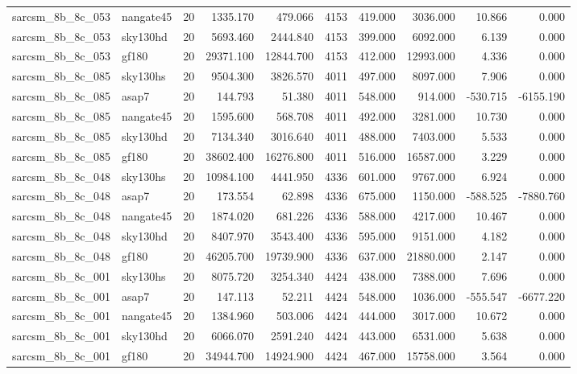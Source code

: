 \begin{tabular}{llrrrrrrrr}
sarcsm\_8b\_8c\_053 & nangate45 & 20 & 1335.170 & 479.066 & 4153 & 419.000 & 3036.000 & 10.866 & 0.000 \\
sarcsm\_8b\_8c\_053 & sky130hd & 20 & 5693.460 & 2444.840 & 4153 & 399.000 & 6092.000 & 6.139 & 0.000 \\
sarcsm\_8b\_8c\_053 & gf180 & 20 & 29371.100 & 12844.700 & 4153 & 412.000 & 12993.000 & 4.336 & 0.000 \\
sarcsm\_8b\_8c\_085 & sky130hs & 20 & 9504.300 & 3826.570 & 4011 & 497.000 & 8097.000 & 7.906 & 0.000 \\
sarcsm\_8b\_8c\_085 & asap7 & 20 & 144.793 & 51.380 & 4011 & 548.000 & 914.000 & -530.715 & -6155.190 \\
sarcsm\_8b\_8c\_085 & nangate45 & 20 & 1595.600 & 568.708 & 4011 & 492.000 & 3281.000 & 10.730 & 0.000 \\
sarcsm\_8b\_8c\_085 & sky130hd & 20 & 7134.340 & 3016.640 & 4011 & 488.000 & 7403.000 & 5.533 & 0.000 \\
sarcsm\_8b\_8c\_085 & gf180 & 20 & 38602.400 & 16276.800 & 4011 & 516.000 & 16587.000 & 3.229 & 0.000 \\
sarcsm\_8b\_8c\_048 & sky130hs & 20 & 10984.100 & 4441.950 & 4336 & 601.000 & 9767.000 & 6.924 & 0.000 \\
sarcsm\_8b\_8c\_048 & asap7 & 20 & 173.554 & 62.898 & 4336 & 675.000 & 1150.000 & -588.525 & -7880.760 \\
sarcsm\_8b\_8c\_048 & nangate45 & 20 & 1874.020 & 681.226 & 4336 & 588.000 & 4217.000 & 10.467 & 0.000 \\
sarcsm\_8b\_8c\_048 & sky130hd & 20 & 8407.970 & 3543.400 & 4336 & 595.000 & 9151.000 & 4.182 & 0.000 \\
sarcsm\_8b\_8c\_048 & gf180 & 20 & 46205.700 & 19739.900 & 4336 & 637.000 & 21880.000 & 2.147 & 0.000 \\
sarcsm\_8b\_8c\_001 & sky130hs & 20 & 8075.720 & 3254.340 & 4424 & 438.000 & 7388.000 & 7.696 & 0.000 \\
sarcsm\_8b\_8c\_001 & asap7 & 20 & 147.113 & 52.211 & 4424 & 548.000 & 1036.000 & -555.547 & -6677.220 \\
sarcsm\_8b\_8c\_001 & nangate45 & 20 & 1384.960 & 503.006 & 4424 & 444.000 & 3017.000 & 10.672 & 0.000 \\
sarcsm\_8b\_8c\_001 & sky130hd & 20 & 6066.070 & 2591.240 & 4424 & 443.000 & 6531.000 & 5.638 & 0.000 \\
sarcsm\_8b\_8c\_001 & gf180 & 20 & 34944.700 & 14924.900 & 4424 & 467.000 & 15758.000 & 3.564 & 0.000 \\

\end{tabular}
